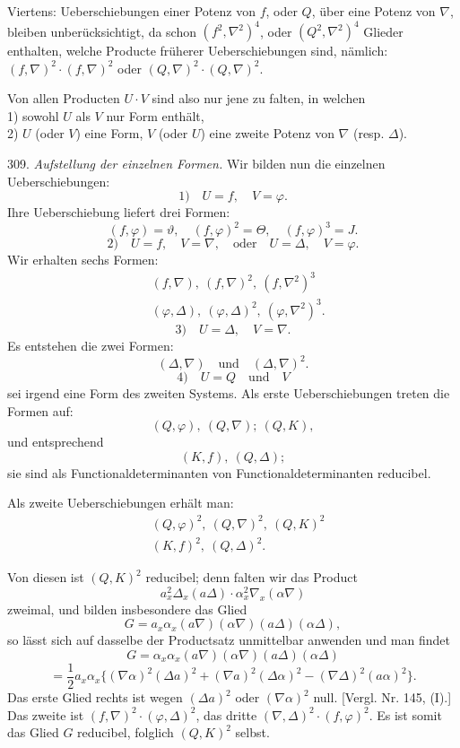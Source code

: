 \documentclass[11pt]{article}
\providecommand{\gesperrt}[1]{\textls[130]{#1}}
\providecommand{\weberpage}[1]{}
\let\Delta\varDelta
\let\Theta\varTheta
\begin{document}
Viertens: Ueberschiebungen einer Potenz von $f$, oder $Q$, über eine Potenz
von $\nabla$, bleiben unberücksichtigt, da schon $(f^2,\nabla^2)^4$, oder
$(Q^2,\nabla^2)^4$ Glieder enthalten, welche Producte früherer
Ueberschiebungen sind, nämlich: $(f,\nabla)^2\cdot(f,\nabla)^2$ oder
$(Q,\nabla)^2\cdot(Q,\nabla)^2$.

Von allen Producten $U\cdot V$ sind also nur jene zu falten, in welchen\\
1) sowohl $U$ als $V$ nur \gesperrt{eine} Form enthält,\\
2) $U$ (oder $V$) eine Form, $V$ (oder $U$) eine zweite Potenz von
$\nabla$ (resp. $\Delta$).

309. \textit{Aufstellung der einzelnen Formen.} Wir bilden nun die
einzelnen Ueberschiebungen:
\[
1) \quad U = f, \quad V = \varphi.
\]
Ihre Ueberschiebung liefert drei Formen:
\[
(f,\varphi) = \vartheta, \quad (f,\varphi)^2 = \Theta, \quad (f,\varphi)^3 = J.
\]
\[
2) \quad U = f, \quad V = \nabla, \quad \text{oder} \quad U = \Delta, \quad V = \varphi.
\]
Wir erhalten sechs Formen:
\[
\begin{aligned}
&(f,\nabla), \ (f,\nabla)^2, \ (f,\nabla^2)^3\\
&(\varphi,\Delta), \ (\varphi,\Delta)^2, \ (\varphi,\nabla^2)^3.
\end{aligned}
\]
\[
3) \quad U = \Delta, \quad V = \nabla.
\]
Es entstehen die zwei Formen:
\[
(\Delta,\nabla) \quad \text{und} \quad (\Delta,\nabla)^2.
\]
\[
4) \quad U = Q \quad \text{und} \quad V
\]
sei irgend eine Form des zweiten Systems. Als erste Ueberschiebungen
treten die Formen auf:
\[
(Q,\varphi), \ (Q,\nabla); \ (Q,K),
\]
und entsprechend
\[
(K,f), \ (Q,\Delta);
\]
sie sind als Functionaldeterminanten von Functionaldeterminanten
reducibel.

Als zweite Ueberschiebungen erhält man:
\[
\begin{aligned}
&(Q,\varphi)^2, \ (Q,\nabla)^2, \ (Q,K)^2\\
&(K,f)^2, \ (Q,\Delta)^2.
\end{aligned}
\]


\weberpage{332}

Von diesen ist $(Q,K)^2$ reducibel; denn falten wir das Product
\[
a_x^2\Delta_x(a\Delta)\cdot \alpha_x^2\nabla_x(\alpha\nabla)
\]
zweimal, und bilden insbesondere das Glied
\[
G = a_x\alpha_x(a\nabla)(\alpha\nabla)(a\Delta)(\alpha\Delta),
\]
so lässt sich auf dasselbe der Productsatz unmittelbar anwenden und man
findet
\[
G = \alpha_x\alpha_x(a\nabla)(\alpha\nabla)(a\Delta)(\alpha\Delta) %
\]
\[
= \frac{1}{2}a_x\alpha_x\{(\nabla\alpha)^2(\Delta a)^2 + (\nabla a)^2(\Delta\alpha)^2 - (\nabla\Delta)^2(a\alpha)^2\}.
\]
Das erste Glied rechts ist wegen $(\Delta a)^2$ oder $(\nabla\alpha)^2$
null. [Vergl. Nr. 145, (I).] Das zweite ist $(f,\nabla)^2\cdot(\varphi,\Delta)^2$,
das dritte $(\nabla,\Delta)^2\cdot(f,\varphi)^2$. Es ist somit das Glied
$G$ reducibel, folglich $(Q,K)^2$ selbst.
\end{document}
